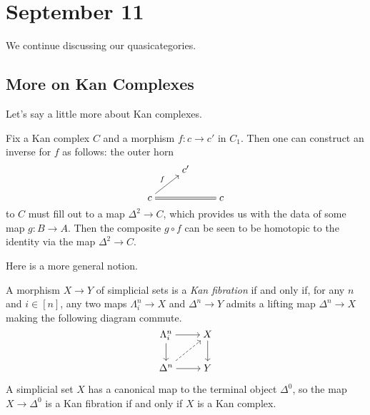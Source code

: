 \documentclass[../notes.tex]{subfiles}
\begin{document}
\section{September 11}
We continue discussing our quasicategories.

\subsection{More on Kan Complexes}
Let's say a little more about Kan complexes.
\begin{remark}
	Fix a Kan complex $C$ and a morphism $f\colon c\to c'$ in $C_1$. Then one can construct an inverse for $f$ as follows: the outer horn
	\[\begin{tikzcd}[cramped]
		& {c'} \\
		c && c
		\arrow["f", from=2-1, to=1-2]
		\arrow[equals, from=2-1, to=2-3]
	\end{tikzcd}\]
	to $C$ must fill out to a map $\Delta^2\to C$, which provides us with the data of some map $g\colon B\to A$. Then the composite $g\circ f$ can be seen to be homotopic to the identity via the map $\Delta^2\to C$.
\end{remark}
Here is a more general notion.
\begin{definition}
	A morphism $X\to Y$ of simplicial sets is a \textit{Kan fibration} if and only if, for any $n$ and $i\in[n]$, any two maps $\Lambda^n_i\to X$ and $\Delta^n\to Y$ admits a lifting map $\Delta^n\to X$ making the following diagram commute.
	\[\begin{tikzcd}[cramped]
		{\Lambda^n_i} & X \\
		{\Delta^n} & Y
		\arrow[from=1-1, to=1-2]
		\arrow[from=1-1, to=2-1]
		\arrow[from=1-2, to=2-2]
		\arrow[dashed, from=2-1, to=1-2]
		\arrow[from=2-1, to=2-2]
	\end{tikzcd}\]
\end{definition}
\begin{example}
	A simplicial set $X$ has a canonical map to the terminal object $\Delta^0$, so the map $X\to\Delta^0$ is a Kan fibration if and only if $X$ is a Kan complex.
\end{example}
\end{document}
